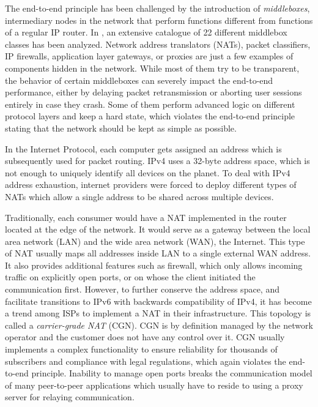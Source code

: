 The end-to-end principle has been challenged by the introduction of \textit{middleboxes}, intermediary nodes in the network that perform functions different from functions of a regular IP router. In \cite{rfc3234}, an extensive catalogue of 22 different middlebox classes has been analyzed. Network address translators (NATs), packet classifiers, IP firewalls, application layer gateways, or proxies are just a few examples of components hidden in the network. While most of them try to be transparent, the behavior of certain middleboxes can severely impact the end-to-end performance, either by delaying packet retransmission or aborting user sessions entirely in case they crash. Some of them perform advanced logic on different protocol layers and keep a hard state, which violates the end-to-end principle stating that the network should be kept as simple as possible.


In the Internet Protocol, each computer gets assigned an address which is subsequently used for packet routing. IPv4 uses a 32-byte address space, which is not enough to uniquely identify all devices on the planet. To deal with IPv4 address exhaustion, internet providers were forced to deploy different types of NATs which allow a single address to be shared across multiple devices.

Traditionally, each consumer would have a NAT implemented in the router located at the edge of the network. It would serve as a gateway between the local area network (LAN) and the wide area network (WAN), the Internet. This type of NAT usually maps all addresses inside LAN to a single external WAN address. It also provides additional features such as firewall, which only allows incoming traffic on explicitly open ports, or on whose the client initiated the communication first.
However, to further conserve the address space, and facilitate transitions to IPv6 with backwards compatibility of IPv4, it has become a trend among ISPs to implement a NAT in their infrastructure. This topology is called a \textit{carrier-grade NAT} (CGN). CGN is by definition managed by the network operator and the customer does not have any control over it. CGN usually implements a complex functionality to ensure reliability for thousands of subscribers and compliance with legal regulations, which again violates the end-to-end principle. Inability to manage open ports breaks the communication model of many peer-to-peer applications which usually have to reside to using a proxy server for relaying communication.

